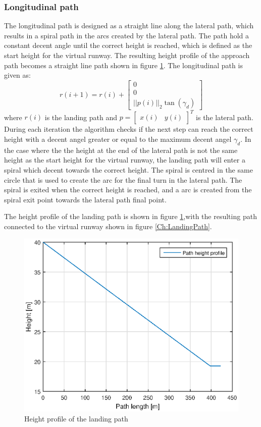 \subsubsection{Longitudinal path}
The longitudinal path is designed as a straight line along the lateral path, which results in a spiral path in the arcs created by the lateral path. The path hold a constant decent angle until the correct height is reached, which is defined as the start height for the virtual runway. The resulting height profile of the approach path becomes a straight line path shown in figure \ref{Fig:HeightProfile}. The longitudinal path is given as:
\begin{equation}
r(i+1) = r(i) +
\begin{bmatrix}
0\\
0\\
||p(i)||_2\tan(\gamma_d)
\end{bmatrix}
\end{equation}
where $r(i)$ is the landing path and 
$p = \begin{bmatrix}
x(i) & y(i)
\end{bmatrix}^T$ is the lateral path. During each iteration the algorithm checks if the next step can reach the correct height with a decent angel greater or equal to the maximum decent angel $\gamma_d$. In the case where the the height at the end of the lateral path is not the same height as the start height for the virtual runway, the landing path will enter a spiral which decent towards the correct height. The spiral is centred in the same circle that is used to create the arc for the final turn in the lateral path. The spiral is exited when the correct height is reached, and a arc is created from the spiral exit point towards the lateral path final point.

The height profile of the landing path is shown in figure \ref{Fig:HeightProfile},with the resulting path connected to the virtual runway shown in figure \ref{Ch:LandingPath}.

\begin{figure}[H]
	\centering
		\includegraphics[width=1\textwidth]{figs/SysPlot/heightProfile.eps}
		\caption{Height profile of the landing path}
		\label{Fig:HeightProfile}
\end{figure}

